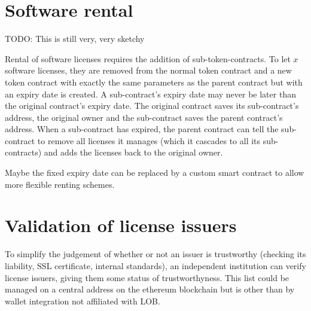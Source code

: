 \documentclass[a4paper]{article}
\newcommand{\todo}[1]{\textsf{TODO: #1}}
\begin{document}
\section{Software rental}

\todo{This is still very, very sketchy}

Rental of software licenses requires the addition of sub-token-contracts. To let $x$ software licenses, they are removed from the normal token contract and a new token contract with exactly the same parameters as the parent contract but with an expiry date is created. A sub-contract's expiry date may never be later than the original contract's expiry date. The original contract saves its sub-contract's address, the original owner and the sub-contract saves the parent contract's address. When a sub-contract has expired, the parent contract can tell the sub-contract to remove all licenses it manages (which it cascades to all its sub-contracts) and adds the licenses back to the original owner.

Maybe the fixed expiry date can be replaced by a custom smart contract to allow more flexible renting schemes.

\section{Validation of license issuers}

To simplify the judgement of whether or not an issuer is trustworthy (checking its liability, SSL certificate, internal standards), an independent institution can verify license issuers, giving them some status of trustworthyness. This list could be managed on a central address on the ethereum blockchain but is other than by wallet integration not affiliated with LOB.


\end{document}
